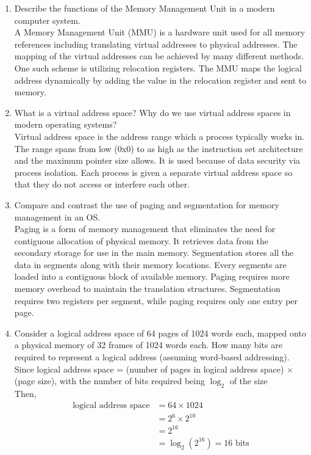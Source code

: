 \documentclass[paper=usletter, fontsize=12pt]{article}
\begin{document}
    \documentinfo{\today}

    \begin{enumerate}

        \item Describe the functions of the Memory Management Unit in a modern
        computer system.\\
        A Memory Management Unit (MMU) is a hardware unit used for all memory
        references including translating virtual addresses to physical
        addresses. The mapping of the virtual addresses can be achieved by many
        different methods. One such scheme is utilizing relocation registers.
        The MMU maps the logical address dynamically by adding the value in the
        relocation register and sent to memory.

        \item What is a virtual address space? Why do we use virtual address
        spaces in modern operating systems?\\
        Virtual address space is the address range which a process typically
        works in. The range spans from low (0x0) to as high as the instruction
        set architecture and the maximum pointer size allows. It is used
        because of data security via process isolation. Each process is given a
        separate virtual address space so that they do not access or interfere
        each other.

        \item Compare and contrast the use of paging and segmentation for
        memory management in an OS.\\
        Paging is a form of memory management that eliminates the need for
        contiguous allocation of physical memory. It retrieves data from the
        secondary storage for use in the main memory. Segmentation stores all
        the data in segments along with their memory locations. Every segments
        are loaded into a contiguous block of available memory. Paging requires
        more memory overhead to maintain the translation structures.
        Segmentation requires two registers per segment, while paging requires
        only one entry per page.

        \item Consider a logical address space of 64 pages of 1024 words each,
        mapped onto a physical memory of 32 frames of 1024 words each. How many
        bits are required to represent a logical address (assuming word-based
        addressing). \\
        Since logical address space = (number of pages in logical address
        space) $\times$ (page size), with the number of bits required being
        $\log_2$ of the size\\
        Then,
        \begin{align*}
            \text{logical address space} & = 64 \times 1024\\
            & = 2^{6} \times 2^{10}\\
            & = 2^{16}\\
            & = \log_2(2^{16}) = 16 \text{ bits}
        \end{align*}


\end{enumerate}
\end{document}
